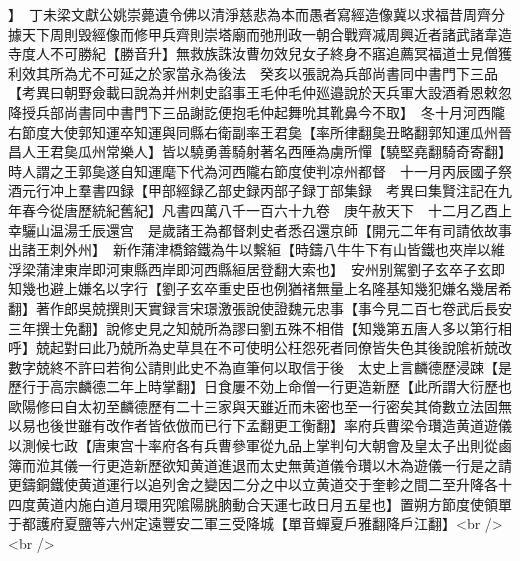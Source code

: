 】　丁未梁文獻公姚崇薨遺令佛以清淨慈悲為本而愚者寫經造像冀以求福昔周齊分據天下周則毁經像而修甲兵齊則崇塔廟而弛刑政一朝合戰齊㓕周興近者諸武諸韋造寺度人不可勝紀【勝音升】無救族誅汝曹勿效兒女子終身不寤追薦冥福道士見僧獲利效其所為尤不可延之於家當永為後法　癸亥以張說為兵部尚書同中書門下三品【考異曰朝野僉載曰說為并州刺史諂事王毛仲毛仲廵邉說於天兵軍大設酒肴恩敕忽降授兵部尚書同中書門下三品謝訖便抱毛仲起舞吮其靴鼻今不取】　冬十月河西隴右節度大使郭知運卒知運與同縣右衛副率王君㚟【率所律翻㚟丑略翻郭知運瓜州晉昌人王君㚟瓜州常樂人】皆以驍勇善騎射著名西陲為虜所憚【驍堅堯翻騎奇寄翻】時人謂之王郭㚟遂自知運麾下代為河西隴右節度使判凉州都督　十一月丙辰國子祭酒元行冲上羣書四録【甲部經録乙部史録丙部子録丁部集録　考異曰集賢注記在九年春今從唐歷統紀舊紀】凡書四萬八千一百六十九卷　庚午赦天下　十二月乙酉上幸驪山温湯壬辰還宫　是歲諸王為都督刺史者悉召還京師【開元二年有司請依故事出諸王刺外州】　新作蒲津橋鎔鐵為牛以繫絙【時鑄八牛牛下有山皆鐵也夾岸以維浮梁蒲津東岸即河東縣西岸即河西縣絙居登翻大索也】　安州别駕劉子玄卒子玄即知幾也避上嫌名以字行【劉子玄卒重史臣也例猶禇無量上名隆基知幾犯嫌名幾居希翻】著作郎吳兢撰則天實録言宋璟激張說使證魏元忠事【事今見二百七卷武后長安三年撰士免翻】說修史見之知兢所為謬曰劉五殊不相借【知幾第五唐人多以第行相呼】兢起對曰此乃兢所為史草具在不可使明公枉怨死者同僚皆失色其後說隂祈兢改數字兢終不許曰若徇公請則此史不為直筆何以取信于後　太史上言麟德歷浸踈【是歷行于高宗麟德二年上時掌翻】日食屢不効上命僧一行更造新歷【此所謂大衍歷也歐陽修曰自太初至麟德歷有二十三家與天雖近而未密也至一行密矣其倚數立法固無以易也後世雖有改作者皆依倣而已行下孟翻更工衡翻】率府兵曹梁令瓚造黄道遊儀以測候七政【唐東宫十率府各有兵曹參軍從九品上掌判句大朝會及皇太子出則從鹵簿而涖其儀一行更造新歷欲知黄道進退而太史無黄道儀令瓚以木為遊儀一行是之請更鑄銅鐵使黄道運行以追列舍之變因二分之中以立黄道交于奎軫之間二至升降各十四度黄道内施白道月環用究隂陽朓朒動合天運七政日月五星也】置朔方節度使領單于都護府夏鹽等六州定遠豐安二軍三受降城【單音蟬夏戶雅翻降戶江翻】<br />
<br />
